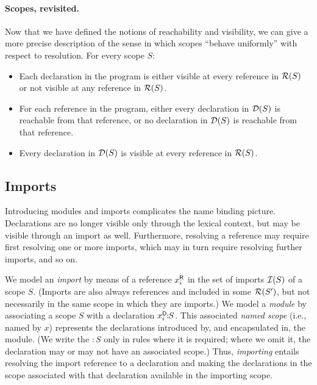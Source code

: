 \paragraph{Scopes, revisited.}
Now that we have defined the notions of reachability and visibility, we can
give a more precise description of the sense in which scopes ``behave
uniformly'' with respect to resolution.  For every scope $S$:
\begin{itemize}
\item Each declaration in the program is either visible
at every reference in $\mathcal{R}(S)$ or not visible at any reference in $\mathcal{R}(S)$.
\item For each reference in the program, either every declaration in $\mathcal{D}(S)$ is
reachable from that reference, or no declaration in $\mathcal{D}(S)$ is reachable 
from that reference. 
\item Every declaration in $\mathcal{D}(S)$ is visible at every reference in $\mathcal{R}(S)$.
\end{itemize}

\subsection{Imports}

Introducing modules and imports complicates the name binding picture.
Declarations are no longer visible only through the lexical context, but may be
visible through an import as well.
Furthermore, resolving a reference may require first resolving one or more
imports, which may in turn require resolving further imports, and so on. 

We model an \emph{import} by means of a reference ${x}^{\mbox{\scriptsize\sf R}}_{i}$ in the set of imports
$\mathcal{I}(S)$ of a scope $S$. (Imports are also always references and included
in some $\mathcal{R}(S')$, but not necessarily in the same scope in which they are
imports.)
We model a \emph{module} by associating a scope $S$ with
a declaration ${x}^{\mbox{\scriptsize\sf D}}_{i}\!\!:\!\!{S}$.  
This associated \emph{named scope} (i.e., named by $x$) 
represents the declarations introduced by, and
encapsulated in, the module.
(We write the $:\!\!S$ only in rules where it is required; where we omit
it, the declaration may or may not have an associated scope.)
Thus, \emph{importing} entails resolving the import reference to a declaration
and making the declarations in the scope associated with that declaration
available in the importing scope.


